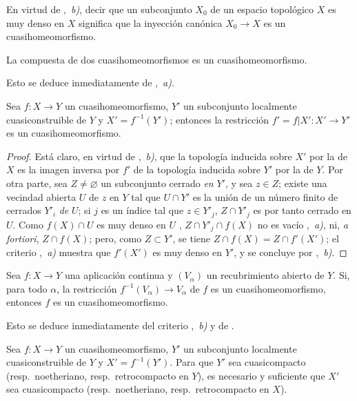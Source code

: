 En virtud de ,~\emph{b)}, decir que un subconjunto $X_0$ de un espacio topológico $X$ es muy denso en $X$ significa que la inyección canónica $X_0\to X$ es un cuasihomeomorfismo.

\begin{corollary}[10.2.3]
\label{IV.10.2.3}
La compuesta de dos cuasihomeomorfismos es un cuasihomeomorfismo.
\end{corollary}

Esto se deduce inmediatamente de ,~\emph{a)}.

\begin{corollary}[10.2.4]
\label{IV.10.2.4}
Sea $f:X\to Y$ un cuasihomeomorfismo, $Y'$ un subconjunto localmente cuasiconstruible de $Y$ y $X'=f^{-1}(Y')$; entonces la restricción $f'=f|X':X'\to Y'$ es un cuasihomeomorfismo.
\end{corollary}

\begin{proof}
Está claro, en virtud de ,~\emph{b)}, que la topología inducida sobre $X'$ por la de $X$ es la imagen inversa por $f'$ de la topología inducida sobre $Y'$ por la de $Y$.
Por otra parte,
sea $Z\neq\varnothing$ un subconjunto cerrado \emph{en} $Y'$, y sea $z\in Z$; existe una vecindad abierta $U$ de $z$ en $Y$ tal que $U\cap Y'$ es la unión de un número finito de cerrados $Y'_i$ \emph{de} $U$; si $j$ es un índice tal que $z\in Y'_j$, $Z\cap Y'_j$ es por tanto cerrado en $U$.
Como $f(X)\cap U$ es muy denso en $U$ , $Z\cap Y'_j\cap f(X)$ no es vacío ,~\emph{a)}, ni, \emph{a fortiori}, $Z\cap f(X)$; pero, como $Z\subset Y'$, se tiene $Z\cap f(X)=Z\cap f'(X')$; el criterio ,~\emph{a)} muestra que $f'(X')$ es muy denso en $Y'$, y se concluye por ,~\emph{b)}.
\end{proof}

\begin{corollary}[10.2.5]
\label{IV.10.2.5}
Sea $f:X\to Y$ una aplicación continua y $(V_\alpha)$ un recubrimiento abierto de $Y$.
Si, para todo $\alpha$, la restricción $f^{-1}(V_\alpha)\to V_\alpha$ de $f$ es un cuasihomeomorfismo, entonces $f$ es un cuasihomeomorfismo.
\end{corollary}

Esto se deduce inmediatamente del criterio ,~\emph{b)} y de .

\begin{corollary}[10.2.6]
\label{IV.10.2.6}
Sea $f:X\to Y$ un cuasihomeomorfismo, $Y'$ un subconjunto localmente cuasiconstruible de $Y$ y $X'=f^{-1}(Y')$.
Para que $Y'$ sea cuasicompacto (\textup{resp.}\ noetheriano, \textup{resp.}\ retrocompacto en $Y$), es necesario y suficiente que $X'$ sea cuasicompacto (\textup{resp.}\ noetheriano, \textup{resp.}\ retrocompacto en $X$).
\end{corollary}

